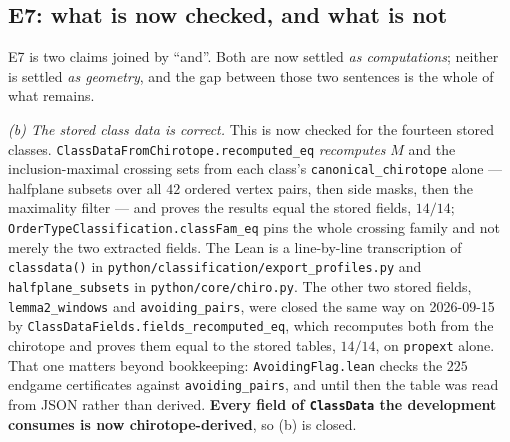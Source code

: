 \documentclass[11pt,a4paper]{article}
\theoremstyle{plain}
\theoremstyle{definition}
\theoremstyle{remark}
\begin{document}
\subsection*{\textsf{E7}: what is now checked, and what is not}\label{sec:e7partial}
\textsf{E7} is two claims joined by ``and''. Both are now settled \emph{as
computations}; neither is settled \emph{as geometry}, and the gap between those
two sentences is the whole of what remains.

\emph{(b) The stored class data is correct.} This is now checked for the
fourteen stored classes. \texttt{ClassDataFromChirotope.recomputed\_eq}
\emph{recomputes} $M$ and the inclusion-maximal crossing sets from each class's
\texttt{canonical\_chirotope} alone --- halfplane subsets over all $42$ ordered
vertex pairs, then side masks, then the maximality filter --- and proves the
results equal the stored fields, $14/14$;
\texttt{OrderTypeClassification.classFam\_eq} pins the whole crossing family and
not merely the two extracted fields. The Lean is a line-by-line transcription of
\texttt{classdata()} in \texttt{python/classification/export\_profiles.py} and
\texttt{halfplane\_subsets} in \texttt{python/core/chiro.py}. The other two
stored fields, \texttt{lemma2\_windows} and \texttt{avoiding\_pairs}, were
closed the same way on 2026-09-15 by
\texttt{ClassDataFields.fields\_recomputed\_eq}, which recomputes both from the
chirotope and proves them equal to the stored tables, $14/14$, on
\texttt{propext} alone. That one matters beyond bookkeeping:
\texttt{AvoidingFlag.lean} checks the $225$ endgame certificates against
\texttt{avoiding\_pairs}, and until then the table was read from JSON rather
than derived. \textbf{Every field of \texttt{ClassData} the development
consumes is now chirotope-derived}, so (b) is closed.
\end{document}
